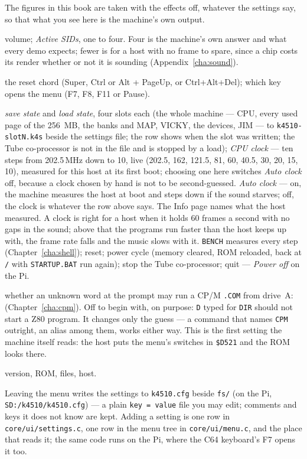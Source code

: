 \begin{description}
  The figures in this book are taken with the effects off, whatever the
  settings say, so that what you see here is the machine's own output.
\item[Audio] volume; \emph{Active SIDs}, one to four. Four is the
  machine's own answer and what every demo expects; fewer is for a host
  with no frame to spare, since a chip costs its render whether or not
  it is sounding (Appendix~\ref{cha:sound}).
\item[Input] the reset chord (Super, Ctrl or Alt + PageUp, or
  Ctrl+Alt+Del); which key opens the menu (F7, F8, F11 or Pause).
\item[Machine] \emph{save state} and \emph{load state}, four slots
  each (the whole machine --- CPU, every used page of the 256~MB, the
  banks and MAP, VICKY, the devices, JIM --- to \texttt{k4510-slotN.k4s}
  beside the settings file; the row shows when the slot was written;
  the Tube co-processor is not in the file and is stopped by a load);
  \emph{CPU clock} --- ten steps from 202.5\,MHz down to 10, live
  (202.5, 162, 121.5, 81, 60, 40.5, 30, 20, 15, 10), measured for this
  host at its first boot; choosing one here switches \emph{Auto clock}
  off, because a clock chosen by hand is not to be second-guessed.
  \emph{Auto clock} --- on, the machine measures the host at boot and
  steps down if the sound starves; off, the clock is whatever the row
  above says. The Info page names what the host measured. A clock is right for a host when it
  holds 60 frames a second with no gaps in the sound; above that the
  programs run faster than the host keeps up with, the frame rate falls
  and the music slows with it. \verb|BENCH| measures every step
  (Chapter~\ref{cha:shell}); reset; power cycle (memory cleared, ROM
  reloaded, back at \texttt{/} with \texttt{STARTUP.BAT} run again);
  stop the Tube co-processor; quit --- \emph{Power off} on the Pi.
\item[Shell] whether an unknown word at the prompt may run a CP/M
  \texttt{.COM} from drive~A: (Chapter~\ref{cha:cpm}). Off to begin
  with, on purpose: \verb|D| typed for \verb|DIR| should not start a Z80
  program. It changes only the guess --- a command that names \verb|CPM|
  outright, an alias among them, works either way. This is the first
  setting the machine itself reads: the host puts the menu's switches in
  \texttt{\$D521} and the ROM looks there.
\item[Info] version, ROM, files, host.
\end{description}

Leaving the menu writes the settings to \texttt{k4510.cfg} beside
\texttt{fs/} (on the Pi, \texttt{SD:/k4510/k4510.cfg}) --- a plain
\texttt{key = value} file you may edit; comments and keys it does not
know are kept. Adding a setting is one row in \texttt{core/ui/settings.c},
one row in the menu tree in \texttt{core/ui/menu.c}, and the place that
reads it; the same code runs on the Pi, where the C64 keyboard's F7 opens
it too.

